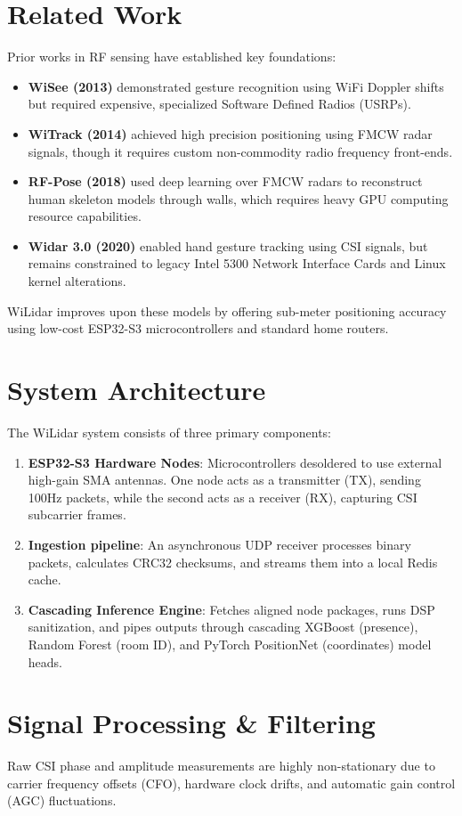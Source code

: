 \documentclass{article}
\begin{document}
\section{Related Work}
Prior works in RF sensing have established key foundations:
\begin{itemize}
    \item \textbf{WiSee (2013)} demonstrated gesture recognition using WiFi Doppler shifts but required expensive, specialized Software Defined Radios (USRPs).
    \item \textbf{WiTrack (2014)} achieved high precision positioning using FMCW radar signals, though it requires custom non-commodity radio frequency front-ends.
    \item \textbf{RF-Pose (2018)} used deep learning over FMCW radars to reconstruct human skeleton models through walls, which requires heavy GPU computing resource capabilities.
    \item \textbf{Widar 3.0 (2020)} enabled hand gesture tracking using CSI signals, but remains constrained to legacy Intel 5300 Network Interface Cards and Linux kernel alterations.
\end{itemize}
WiLidar improves upon these models by offering sub-meter positioning accuracy using low-cost ESP32-S3 microcontrollers and standard home routers.

\section{System Architecture}
The WiLidar system consists of three primary components:
\begin{enumerate}
    \item \textbf{ESP32-S3 Hardware Nodes}: Microcontrollers desoldered to use external high-gain SMA antennas. One node acts as a transmitter (TX), sending 100Hz packets, while the second acts as a receiver (RX), capturing CSI subcarrier frames.
    \item \textbf{Ingestion pipeline}: An asynchronous UDP receiver processes binary packets, calculates CRC32 checksums, and streams them into a local Redis cache.
    \item \textbf{Cascading Inference Engine}: Fetches aligned node packages, runs DSP sanitization, and pipes outputs through cascading XGBoost (presence), Random Forest (room ID), and PyTorch PositionNet (coordinates) model heads.
\end{enumerate}

\section{Signal Processing \& Filtering}
Raw CSI phase and amplitude measurements are highly non-stationary due to carrier frequency offsets (CFO), hardware clock drifts, and automatic gain control (AGC) fluctuations.
\end{document}
